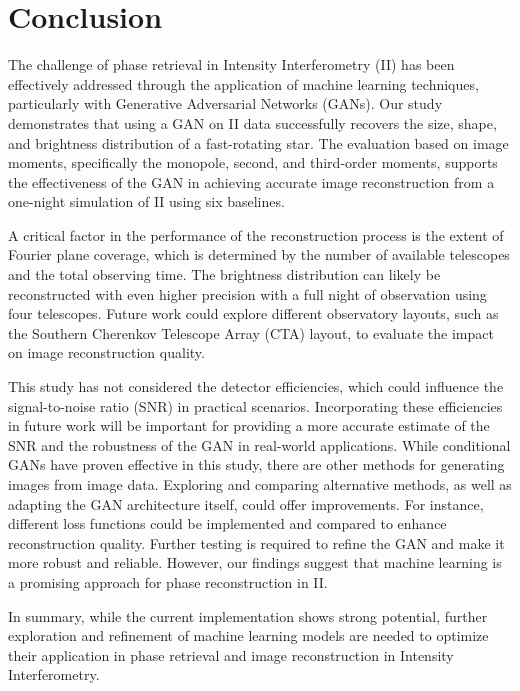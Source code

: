 \section{Conclusion}
The challenge of phase retrieval in Intensity Interferometry (II) has been effectively addressed through the application of machine learning techniques, particularly with Generative Adversarial Networks (GANs). Our study demonstrates that using a GAN on II data successfully recovers the size, shape, and brightness distribution of a fast-rotating star. The evaluation based on image moments, specifically the monopole, second, and third-order moments, supports the effectiveness of the GAN in achieving accurate image reconstruction from a one-night simulation of II using six baselines.

A critical factor in the performance of the reconstruction process is the extent of Fourier plane coverage, which is determined by the number of available telescopes and the total observing time. The brightness distribution can likely be reconstructed with even higher precision with a full night of observation using four telescopes. Future work could explore different observatory layouts, such as the Southern Cherenkov Telescope Array (CTA) layout, to evaluate the impact on image reconstruction quality.

This study has not considered the detector efficiencies, which could influence the signal-to-noise ratio (SNR) in practical scenarios. Incorporating these efficiencies in future work will be important for providing a more accurate estimate of the SNR and the robustness of the GAN in real-world applications. While conditional GANs have proven effective in this study, there are other methods for generating images from image data. Exploring and comparing alternative methods, as well as adapting the GAN architecture itself, could offer improvements. For instance, different loss functions could be implemented and compared to enhance reconstruction quality. Further testing is required to refine the GAN and make it more robust and reliable. However, our findings suggest that machine learning is a promising approach for phase reconstruction in II.

In summary, while the current implementation shows strong potential, further exploration and refinement of machine learning models are needed to optimize their application in phase retrieval and image reconstruction in Intensity Interferometry.